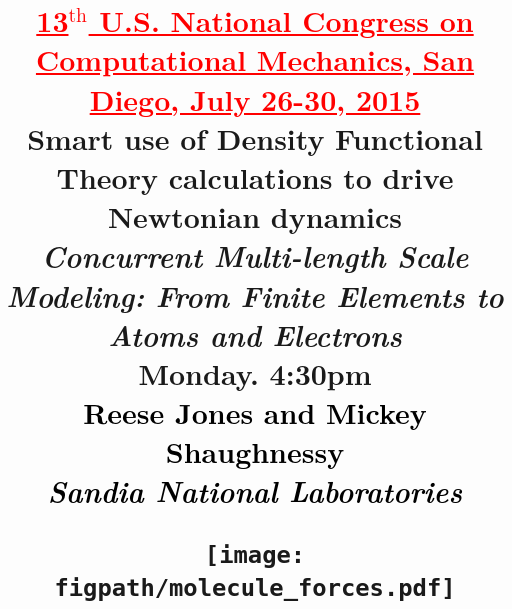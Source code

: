 \documentclass{beamer}
\newcommand{\figpath}{../../Figures/}
\newcommand{\red} [1]{\textcolor{red}{#1}}
\newcommand{\black}[1]{\textcolor{black}{#1}}
\begin{document}
\title{
\red{\underline{\tiny 13$^\text{th}$ U.S. National Congress on Computational Mechanics, San Diego, July 26-30, 2015}} \\
{\bf Smart use of Density Functional Theory calculations to drive Newtonian dynamics} \\
\vspace{-0.1in}
{\tiny \it Concurrent Multi-length Scale Modeling: From Finite Elements to Atoms and Electrons} \\
\vspace{-0.1in}
{\tiny Monday. 4:30pm } \\
\vspace{-0.01in}
\large
\black{{\bf Reese Jones} and Mickey Shaughnessy} \\
\vspace{-0.01in}
\black{\it \small  Sandia National Laboratories}
\vspace{-0.1in}
\begin{center}
\texttt{[image: \\figpath/molecule\_forces.pdf]} \\
\end{center}
\date{}
}
\frame{\titlepage}
\end{document}
